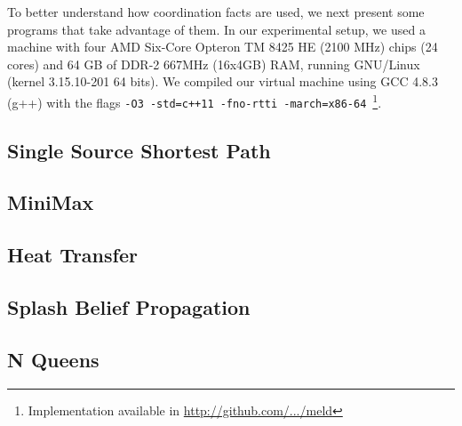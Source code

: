 
To better understand how coordination facts are used, we next present some programs that
take advantage of them. In our experimental setup, we used a machine with
four AMD Six-Core Opteron TM 8425 HE (2100 MHz) chips (24 cores) and 64 GB of
DDR-2 667MHz (16x4GB) RAM, running GNU/Linux (kernel 3.15.10-201 64 bits).
We compiled our virtual machine using GCC 4.8.3 (g++) with the flags
\texttt{-O3 -std=c++11 -fno-rtti -march=x86-64}~\footnote{Implementation
   available in \url{http://github.com/.../meld}}.

\subsection{Single Source Shortest Path}


\subsection{MiniMax}


\subsection{Heat Transfer}


\subsection{Splash Belief Propagation}


\subsection{N Queens}

